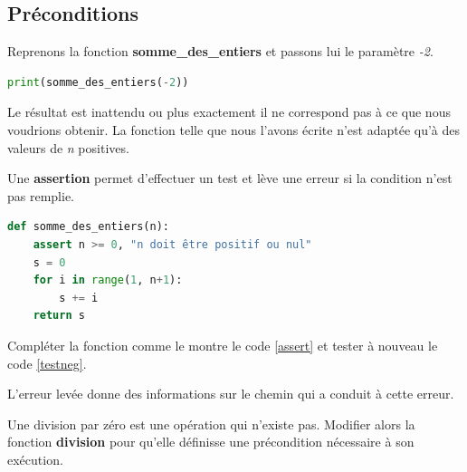 \documentclass[a4paper,11pt]{article}
\begin{document}
\begin{Form}
\section{Préconditions}
Reprenons la fonction \textbf{somme\_des\_entiers} et passons lui le paramètre \emph{-2}.
\begin{center}
\begin{lstlisting}[language=Python]
print(somme_des_entiers(-2))
\end{lstlisting}
\label{testneg}
\end{center}
Le résultat est inattendu ou plus exactement il ne correspond pas à ce que nous voudrions obtenir. La fonction telle que nous l'avons écrite n'est adaptée qu'à des valeurs de \emph{n} positives.
\begin{aretenir}[]
Une \textbf{assertion} permet d'effectuer un test et lève une erreur si la condition n'est pas remplie.
\end{aretenir}
\begin{center}
\begin{lstlisting}[language=Python]
def somme_des_entiers(n):
    assert n >= 0, "n doit être positif ou nul"
    s = 0
    for i in range(1, n+1):
        s += i
    return s
\end{lstlisting}
\label{assert}
\end{center}
\begin{activite}
Compléter la fonction comme le montre le code \ref{assert} et tester à nouveau le code \ref{testneg}.
\end{activite}
L'erreur levée donne des informations sur le chemin qui a conduit à cette erreur.
\begin{activite}
Une division par zéro est une opération qui n'existe pas. Modifier alors la fonction \textbf{division} pour qu'elle définisse une précondition nécessaire à son exécution.
\end{activite}
\end{Form}
\end{document}
